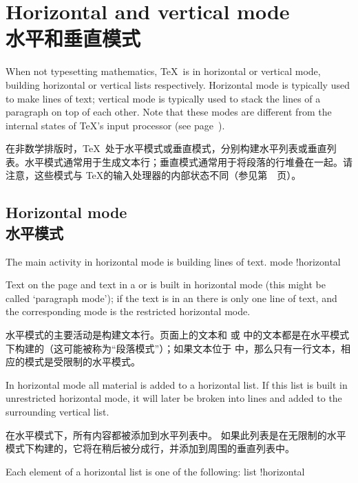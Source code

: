 \section{Horizontal and vertical mode\\水平和垂直模式}

When not typesetting mathematics, \TeX\ is in horizontal
or vertical mode, building horizontal or vertical lists
respectively. Horizontal mode is typically used to
make lines of text; vertical mode is typically used
to stack the lines of a paragraph on top of each other.
Note that
these modes
are different from the internal states of \TeX's input processor
(see page~\pageref{input:states}).

在非数学排版时，\TeX\ 处于水平模式或垂直模式，分别构建水平列表或垂直列表。水平模式通常用于生成文本行；垂直模式通常用于将段落的行堆叠在一起。请注意，这些模式与 \TeX 的输入处理器的内部状态不同（参见第~\pageref{input:states}~页）。
\subsection{Horizontal mode\\水平模式}

The main activity in horizontal mode is building lines of text.
\term mode !horizontal\par
Text on the page and text in a  or  is built in
horizontal mode (this might be called `paragraph mode');
if the text is in an  there is only one line
of text, and the corresponding mode is the restricted
\awp
horizontal mode.

水平模式的主要活动是构建文本行。页面上的文本和  或  中的文本都是在水平模式下构建的（这可能被称为“段落模式”）；如果文本位于  中，那么只有一行文本，相应的模式是受限制的水平模式。

In horizontal mode all material is added to a horizontal list.
If this list is built in unrestricted horizontal mode, it
will later be broken into lines and added to the surrounding vertical list.

在水平模式下，所有内容都被添加到水平列表中。
如果此列表是在无限制的水平模式下构建的，它将在稍后被分成行，并添加到周围的垂直列表中。

Each element of a horizontal list is one of the following:
\term list !horizontal\par


